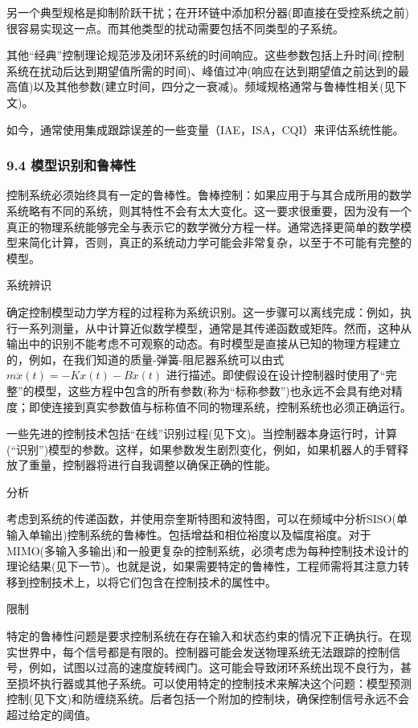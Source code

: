另一个典型规格是抑制阶跃干扰；在开环链中添加积分器(即直接在受控系统之前)很容易实现这一点。而其他类型的扰动需要包括不同类型的子系统。

其他“经典”控制理论规范涉及闭环系统的时间响应。这些参数包括上升时间(控制系统在扰动后达到期望值所需的时间)、峰值过冲(响应在达到期望值之前达到的最高值)以及其他参数(建立时间，四分之一衰减)。频域规格通常与鲁棒性相关(见下文)。

如今，通常使用集成跟踪误差的一些变量（IAE，ISA，CQI）来评估系统性能。


\subsubsection{9.4 模型识别和鲁棒性}

控制系统必须始终具有一定的鲁棒性。鲁棒控制：如果应用于与其合成所用的数学系统略有不同的系统，则其特性不会有太大变化。这一要求很重要，因为没有一个真正的物理系统能够完全与表示它的数学微分方程一样。通常选择更简单的数学模型来简化计算，否则，真正的系统动力学可能会非常复杂，以至于不可能有完整的模型。

系统辨识

确定控制模型动力学方程的过程称为系统识别。这一步骤可以离线完成：例如，执行一系列测量，从中计算近似数学模型，通常是其传递函数或矩阵。然而，这种从输出中的识别不能考虑不可观察的动态。有时模型是直接从已知的物理方程建立的，例如，在我们知道的质量-弹簧-阻尼器系统可以由式$m\ddot{x}(t) = -Kx(t) - B\dot{x}(t)$ 进行描述。即使假设在设计控制器时使用了“完整”的模型，这些方程中包含的所有参数(称为“标称参数”)也永远不会具有绝对精度；即使连接到真实参数值与标称值不同的物理系统，控制系统也必须正确运行。

一些先进的控制技术包括“在线”识别过程(见下文)。当控制器本身运行时，计算(“识别”)模型的参数。这样，如果参数发生剧烈变化，例如，如果机器人的手臂释放了重量，控制器将进行自我调整以确保正确的性能。

分析

考虑到系统的传递函数，并使用奈奎斯特图和波特图，可以在频域中分析SISO(单输入单输出)控制系统的鲁棒性。包括增益和相位裕度以及幅度裕度。对于MIMO(多输入多输出)和一般更复杂的控制系统，必须考虑为每种控制技术设计的理论结果(见下一节)。也就是说，如果需要特定的鲁棒性，工程师需将其注意力转移到控制技术上，以将它们包含在控制技术的属性中。

限制

特定的鲁棒性问题是要求控制系统在存在输入和状态约束的情况下正确执行。在现实世界中，每个信号都是有限的。控制器可能会发送物理系统无法跟踪的控制信号，例如，试图以过高的速度旋转阀门。这可能会导致闭环系统出现不良行为，甚至损坏执行器或其他子系统。可以使用特定的控制技术来解决这个问题：模型预测控制(见下文)和防缠绕系统。后者包括一个附加的控制块，确保控制信号永远不会超过给定的阈值。

